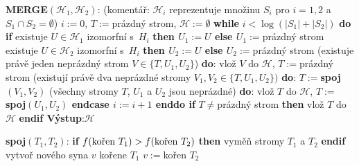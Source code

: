 \documentclass[a4paper,12pt]{article}
\begin{document}
{\bf MERGE$(\mathcal H_1,\mathcal H_2)$}:\newline 
(komentář: $\mathcal H_i$ reprezentuje množinu $S_i$ pro $i=1
,2$ a $S_1\cap S_2=\emptyset$)\newline 
$i:=0$, $T:=$prázdný strom, $\mathcal H:=\emptyset$\newline 
{\bf while} $i<\log(|S_1|+|S_2|)$ {\bf do\newline 
\phantom{{\rm ---}}if} existuje $U\in \mathcal H_1$ izomorfní s~$
H_i$ {\bf then\newline 
\phantom{{\rm ------}}$U_1:=U$\newline 
\phantom{{\rm ---}}else\newline 
\phantom{{\rm ------}}$U_1:=$}prázdný strom\newline 
{} existuje $U\in \mathcal H_2$ izomorfní s~$
H_i$ {\bf then\newline 
\phantom{{\rm ------}}$U_2:=U$\newline 
\phantom{{\rm ---}}else\newline 
\phantom{{\rm ------}}$U_2:=$}prázdný strom\newline 
{}(existuje právě jeden neprázdný strom 
$V\in \{T,U_1,U_2\}$) {\bf do}:\newline 
\phantom{---------}vlož $V$ do $\mathcal H$, $T:=$prázdný strom\newline 
\phantom{------}(existují právě dva neprázdné stromy 
$V_1,V_2\in \{T,U_1,U_2\})$ {\bf do}:\newline 
\phantom{---------}$T:=${\bf spoj$(V_1,V_2)$\newline 
\phantom{{\rm ------}}}(všechny stromy $T$, $U_1$ a $U_2$ jsou neprázdné) {\bf do}:\newline 
\phantom{---------}vlož $T$ do $\mathcal H$, $T:=${\bf spoj$(U_1,U_
2)$\newline 
\phantom{{\rm ---}}endcase\newline 
\phantom{{\rm ---}}$i:=i+1$\newline 
enddo\newline 
if} $T\ne$prázdný strom {\bf then} vlož $T$ do $\mathcal H$ {\bf endif\newline 
Výstup}:$\mathcal H$

{\bf spoj$(T_1,T_2)$}:\newline 
{\bf if} $f(\text{\rm kořen }T_1)>f(\text{\rm kořen }T_2)$ {\bf then\newline 
\phantom{{\rm ---}}}vyměň stromy $T_1$ a $T_2$\newline 
{\bf endif\newline }
vytvoř nového  syna $v$ kořene $T_1$\newline 
$v:=$kořen $T_2$
\end{document}
